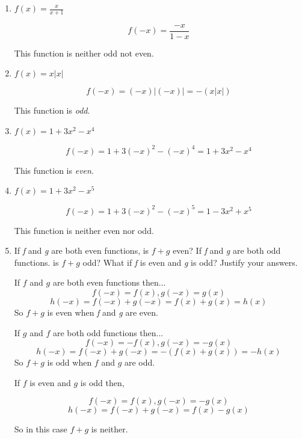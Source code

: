 \documentclass{article}
\begin{document}
\begin{enumerate}
	\item $f(x) = \frac{x}{x + 1}$

		$$f(-x) = \frac{-x}{1 - x}$$

		This function is neither odd not even.

	\item $f(x) = x | x |$

		$$f(-x) = (-x) | (-x) | =  - (x | x |)$$

		This function is \emph{odd}.

	\item $f(x) = 1 + 3x^2 - x^4$

		$$f( -x) = 1 + 3(-x)^2 - (-x)^4 = 1 + 3x^2 - x^4$$

		This function is \emph{even}.

	\item $f(x) = 1 + 3x^2- x^5$

		$$f( - x ) = 1 + 3(-x)^2 - (-x)^5 = 1 - 3x^2 + x^5$$

		This function is neither even nor odd.

	\item If \emph{f} and \emph{g} are both even functions, is $f + g$ even? If
		\emph{f} and \emph{g} are both odd functions. is $f + g$ odd? What if
		\emph{f} is even and \emph{g} is odd? Justify your answers.

		If $f$ and $g$ are both even functions then...
		$$ f(-x) = f(x), g(-x) = g(x)$$
		$$h(-x) = f(-x) + g(-x) = f(x) + g(x) = h(x)$$
		So $f + g$ is even when \emph{f} and \emph{g} are even.

		If $g$ and $f$ are both odd functions then...
		$$f(-x) = - f(x), g(-x) = -g(x)$$
		$$h(-x) = f(-x) + g(-x) = - (f(x) + g(x)) = - h(x)$$
		So $f + g$ is odd when $f$ and $g$ are odd.

		If $f$ is even and $g$ is odd then,
		
		$$ f(-x) = f(x), g(-x) = -g(x)$$
		$$h(-x) = f(-x) + g(-x) = f(x) - g(x)$$

		So in this case $f + g$ is neither.
		
	\end{enumerate}
	
\end{document}
